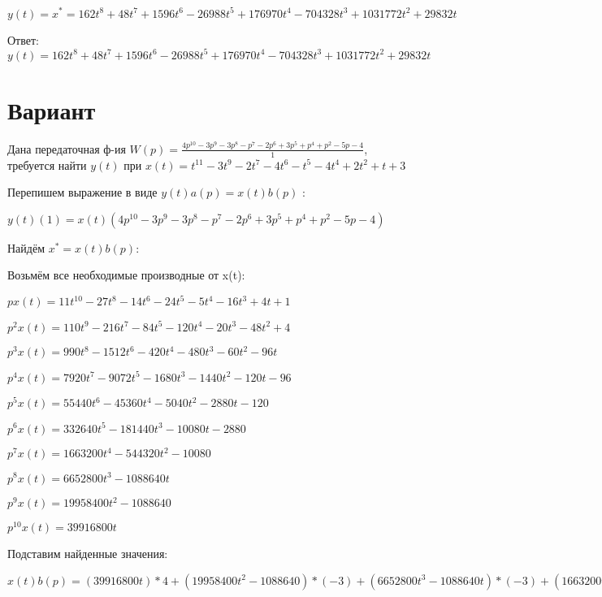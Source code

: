 \documentclass{article}
\begin{document}
{{$y(t)=x^*=162t^{8}+48t^{7}+1596t^{6}-26988t^{5}+176970t^{4}-704328t^{3}+1031772t^{2}+29832t$

Ответ: $y(t) = 162t^{8}+48t^{7}+1596t^{6}-26988t^{5}+176970t^{4}-704328t^{3}+1031772t^{2}+29832t$

\section{Вариант}

Дана передаточная ф-ия $W(p)=\frac{4p^{10}-3p^{9}-3p^{8}-p^{7}-2p^{6}+3p^{5}+p^{4}+p^{2}-5p-4}{1}$, требуется найти $y(t)$ при $x(t)=t^{11}-3t^{9}-2t^{7}-4t^{6}-t^{5}-4t^{4}+2t^{2}+t+3$

Перепишем выражение в виде $y(t)a(p)=x(t)b(p)$ :

$y(t)(1)=x(t)(4p^{10}-3p^{9}-3p^{8}-p^{7}-2p^{6}+3p^{5}+p^{4}+p^{2}-5p-4)$

Найдём $x^*=x(t)b(p)$:

Возьмём все необходимые производные от x(t):

$px(t)=11t^{10}-27t^{8}-14t^{6}-24t^{5}-5t^{4}-16t^{3}+4t+1$

$p^2x(t)=110t^{9}-216t^{7}-84t^{5}-120t^{4}-20t^{3}-48t^{2}+4$

$p^3x(t)=990t^{8}-1512t^{6}-420t^{4}-480t^{3}-60t^{2}-96t$

$p^4x(t)=7920t^{7}-9072t^{5}-1680t^{3}-1440t^{2}-120t-96$

$p^5x(t)=55440t^{6}-45360t^{4}-5040t^{2}-2880t-120$

$p^6x(t)=332640t^{5}-181440t^{3}-10080t-2880$

$p^7x(t)=1663200t^{4}-544320t^{2}-10080$

$p^8x(t)=6652800t^{3}-1088640t$

$p^9x(t)=19958400t^{2}-1088640$

$p^10x(t)=39916800t$

Подставим найденные значения:

$x(t)b(p) = (39916800t)*4+(19958400t^{2}-1088640)*(-3)+(6652800t^{3}-1088640t)*(-3)+(1663200t^{4}-544320t^{2}-10080)*(-1)+(332640t^{5}-181440t^{3}-10080t-2880)*(-2)+(55440t^{6}-45360t^{4}-5040t^{2}-2880t-120)*3+(7920t^{7}-9072t^{5}-1680t^{3}-1440t^{2}-120t-96)*1+(110t^{9}-216t^{7}-84t^{5}-120t^{4}-20t^{3}-48t^{2}+4)*1+(11t^{10}-27t^{8}-14t^{6}-24t^{5}-5t^{4}-16t^{3}+4t+1)*(-5)+(11t^{10}-27t^{8}-14t^{6}-24t^{5}-5t^{4}-16t^{3}+4t+1)*(-4)=-99t^{10}+110t^{9}+243t^{8}+7704t^{7}+166446t^{6}-674220t^{5}-1799355t^{4}-19597076t^{3}-59347488t^{2}+162944484t$





}}
\end{document}

